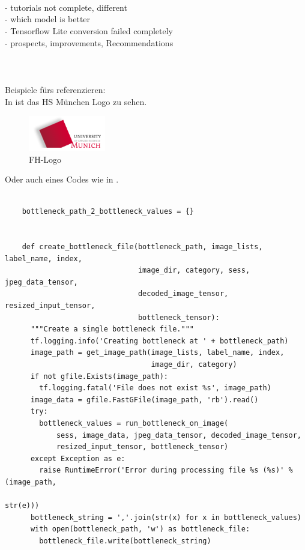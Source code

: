 \\
\\
\\

- tutorials not complete, different \\
- which model is better \\
- Tensorflow Lite conversion failed completely \\
- prospects, improvements, Recommendations \\
\\
\\ \\
Beispiele fürs referenzieren: \\
In  ist das HS München Logo zu sehen.

\begin{figure}[htbp]
\includegraphics[width=0.3\textwidth]{includes/MUASlogo}
\caption{FH-Logo}
\label{fig:FH-Logo}
\end{figure}

Oder auch eines Codes wie in  .\\
\begin{lstlisting}[caption=Some python code, label=list:python_Code]

	bottleneck_path_2_bottleneck_values = {}


	def create_bottleneck_file(bottleneck_path, image_lists, label_name, index,
	                           image_dir, category, sess, jpeg_data_tensor,
	                           decoded_image_tensor, resized_input_tensor,
	                           bottleneck_tensor):
	  """Create a single bottleneck file."""
	  tf.logging.info('Creating bottleneck at ' + bottleneck_path)
	  image_path = get_image_path(image_lists, label_name, index,
	                              image_dir, category)
	  if not gfile.Exists(image_path):
	    tf.logging.fatal('File does not exist %s', image_path)
	  image_data = gfile.FastGFile(image_path, 'rb').read()
	  try:
	    bottleneck_values = run_bottleneck_on_image(
	        sess, image_data, jpeg_data_tensor, decoded_image_tensor,
	        resized_input_tensor, bottleneck_tensor)
	  except Exception as e:
	    raise RuntimeError('Error during processing file %s (%s)' % (image_path,
	                                                                 str(e)))
	  bottleneck_string = ','.join(str(x) for x in bottleneck_values)
	  with open(bottleneck_path, 'w') as bottleneck_file:
	    bottleneck_file.write(bottleneck_string)
\end{lstlisting}

